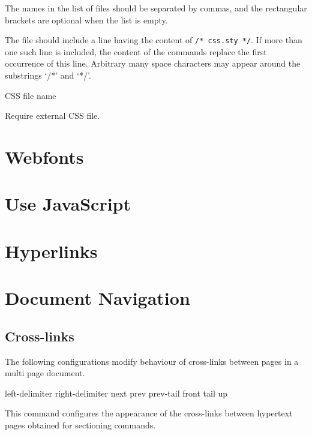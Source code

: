 \documentclass{book}
\begin{document}

The names in the list of files should be separated by commas, and the rectangular brackets are optional when the list is empty.

The file should include a line having the content of \verb|/* css.sty */|. If
more than one such line is included, the content of the  commands
replace the first occurrence of this line. Arbitrary many space characters may
appear around the substrings ‘/*’ and ‘*/’. 

 {CSS file name}\EndDoc

Require external CSS file.

\section{Webfonts}

\section{Use JavaScript}
\section{Hyperlinks}
\section{Document Navigation}

\subsection{Cross-links}

The following configurations modify behaviour of cross-links between pages in a multi page document.

 {left-delimiter} {right-delimiter} {next} {prev} {prev-tail} {front} {tail} {up}\EndDoc

This command configures the appearance of the cross-links between hypertext pages obtained for sectioning commands.
\end{document}
